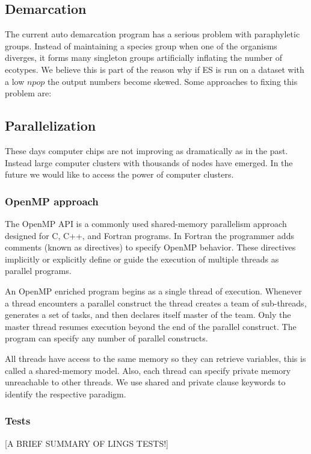 \subsection*{Demarcation}
The current auto demarcation program has a serious problem with paraphyletic groups.
Instead of maintaining a species group when one of the organisms diverges, it forms many singleton groups artificially inflating the number of ecotypes.
We believe this is part of the reason why if ES is run on a dataset with a low $npop$ the output numbers become skewed.
Some approaches to fixing this problem are:

\subsection*{Parallelization}
These days computer chips are not improving as dramatically as in the past.
Instead large computer clusters with thousands of nodes have emerged.
In the future we would like to access the power of computer clusters.

\subsubsection*{OpenMP approach} %
The OpenMP API is a commonly used shared-memory parallelism approach designed for C, C++, and Fortran programs.
In Fortran the programmer adds comments (known as directives) to specify OpenMP behavior.
These directives implicitly or explicitly define or guide the execution of multiple threads as parallel programs.

An OpenMP enriched program begins as a single thread of execution.
Whenever a thread encounters a parallel construct the thread creates a team of sub-threads, generates a set of tasks, and then declares itself master of the team.
Only the master thread resumes execution beyond the end of the parallel construct.
The program can specify any number of parallel constructs.

All threads have access to the same memory so they can retrieve variables, this is called a shared-memory model.
Also, each thread can specify private memory unreachable to other threads.
We use shared and private clause keywords to identify the respective paradigm.

\subsubsection*{Tests}
[A BRIEF SUMMARY OF LINGS TESTS!]


